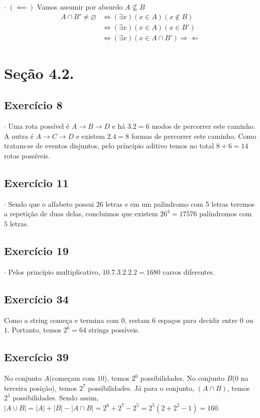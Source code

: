 \documentclass[12pt,a4paper]{article}
\begin{document}
$\cdot$ $(\impliedby)$ Vamos assumir por absurdo $A \not\subseteq B $
\begin{equation*}
\begin{split}
A\cap B' \neq \varnothing &\iff (\exists x)(x\in A)(x\not\in B) \\
&\iff (\exists x)(x\in A)(x\in B') \\
&\iff (\exists x)(x\in A\cap B') \Rightarrow\Leftarrow
\end{split} 
\end{equation*}

\section*{Seção 4.2.}
\subsection*{Exercício 8}
$\cdot$ Uma rota possível é $A \to B \to D$ e há $3.2=6$ modos de percorrer este caminho. A outra é $A \to C \to D$ e existem $2.4=8$ formas de percorrer este caminho. Como tratam-se de eventos disjuntos, pelo príncipio aditivo temos no total $8+6=14$ rotas possíveis.
\subsection*{Exercício 11}
$\cdot$ Sendo que o alfabeto possui $26$ letras e em um palíndromo com 5 letras teremos a repetição de duas delas, concluimos que existem $26^3 = 17576$ palíndromos com $5$ letras.
\subsection*{Exercício 19}
$\cdot$ Pelos princípio multiplicativo, $10.7.3.2.2.2 = 1680$ carros diferentes.
\subsection*{Exercício 34}
Como a string começa e termina com $0$, restam 6 espaços para decidir entre $0$ ou $1$. Portanto, temos $2^6 = 64$ strings possíveis.
\subsection*{Exercício 39}
No conjunto $A$(começam com $10$), temos $2^6$ possibilidades. No conjunto $B$($0$ na terceira posição), temos $2^7$ possibilidades. Já para o conjunto, $(A\cap B)$, temos $2^5$ possibilidades. Sendo assim, $|A\cup B| =|A|+|B|-|A\cap B| = 2^6 + 2^7 - 2^5 = 2^5(2+2^2-1)=160$.
\end{document}

